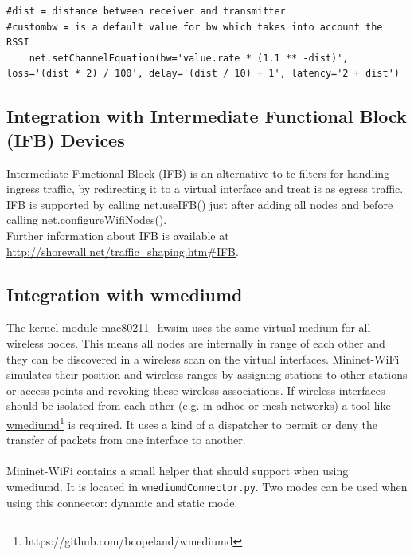 \begin{verbatim}
#dist = distance between receiver and transmitter
#custombw = is a default value for bw which takes into account the RSSI
    net.setChannelEquation(bw='value.rate * (1.1 ** -dist)', loss='(dist * 2) / 100', delay='(dist / 10) + 1', latency='2 + dist')
\end{verbatim}

\subsection{Integration with Intermediate Functional Block (IFB) Devices}\label{ifb}

Intermediate Functional Block (IFB) is an alternative to tc filters for handling ingress traffic, by redirecting it to a virtual interface and treat is as egress traffic. IFB is supported by calling net.useIFB() just after adding all nodes and before calling net.configureWifiNodes().
\\
Further information about IFB is available at \url{http://shorewall.net/traffic\_shaping.htm\#IFB}.



\subsection{Integration with wmediumd}\label{wmediumd}
The kernel module mac80211\_hwsim uses the same virtual medium for all wireless nodes. This means all nodes are internally in range of each other and they can be discovered in a wireless scan on the virtual interfaces. Mininet-WiFi simulates their position and wireless ranges by assigning stations to other stations or access points and revoking these wireless associations. If wireless interfaces should be isolated from each other (e.g. in adhoc or mesh networks) a tool like \underline{\href{https://github.com/bcopeland/wmediumd}{wmediumd}}\footnote{https://github.com/bcopeland/wmediumd} is required. It uses a kind of a dispatcher to permit or deny the transfer of packets from one interface to another.\\
\\
Mininet-WiFi contains a small helper that should support when using wmediumd. It is located in \texttt{wmediumdConnector.py}. Two modes can be used when using this connector: dynamic and static mode.

